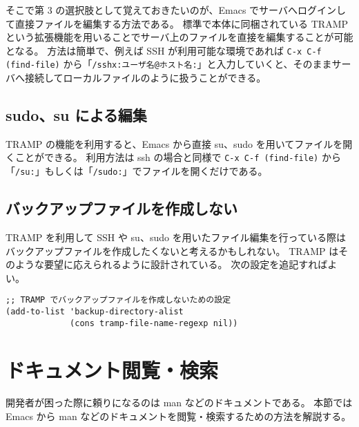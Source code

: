 そこで第 3 の選択肢として覚えておきたいのが、Emacs でサーバへログインして直接ファイルを編集する方法である。
標準で本体に同梱されている TRAMP という拡張機能を用いることでサーバ上のファイルを直接を編集することが可能となる。
方法は簡単で、例えば SSH が利用可能な環境であれば \texttt{C-x C-f (find-file)} から「\texttt{/sshx:ユーザ名@ホスト名:}」と入力していくと、そのままサーバへ接続してローカルファイルのように扱うことができる。
\subsection{sudo、su による編集}
TRAMP の機能を利用すると、Emacs から直接 su、sudo を用いてファイルを開くことができる。
利用方法は ssh の場合と同様で \texttt{C-x C-f (find-file)} から「\texttt{/su:}」もしくは「\texttt{/sudo:}」でファイルを開くだけである。
\subsection{バックアップファイルを作成しない}
TRAMP を利用して SSH や su、sudo を用いたファイル編集を行っている際はバックアップファイルを作成したくないと考えるかもしれない。
TRAMP はそのような要望に応えられるように設計されている。
次の設定を追記すればよい。
\begin{mdframed}[roundcorner=0.50zw,leftmargin=3.00zw,rightmargin=3.00zw,skipabove=0.40zw,skipbelow=0.40zw,innertopmargin=4.00pt,innerbottommargin=4.00pt,innerleftmargin=5.00pt,innerrightmargin=5.00pt,linecolor=gray!020,linewidth=0.50pt,backgroundcolor=gray!20]
\begin{verbatim}
;; TRAMP でバックアップファイルを作成しないための設定
(add-to-list 'backup-directory-alist
             (cons tramp-file-name-regexp nil))
\end{verbatim}
\end{mdframed}
\section{ドキュメント閲覧・検索}
開発者が困った際に頼りになるのは man などのドキュメントである。
本節では Emacs から man などのドキュメントを閲覧・検索するための方法を解説する。\\

